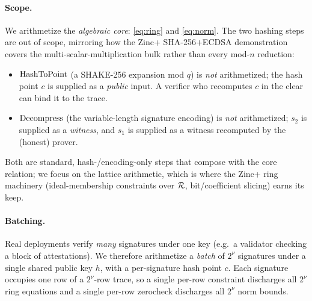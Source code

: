 \paragraph{Scope.}
We arithmetize the \emph{algebraic core}:
\cref{eq:ring} and \cref{eq:norm}. The two hashing steps are out of
scope, mirroring how the Zinc+ SHA-256$+$ECDSA demonstration covers the
multi-scalar-multiplication bulk rather than every mod-$n$ reduction:
\begin{itemize}[leftmargin=1.5em]
  \item $\operatorname{HashToPoint}$ (a SHAKE-256 expansion mod $q$) is \emph{not}
  arithmetized; the hash point $c$ is supplied as a \emph{public}
  input. A verifier who recomputes $c$ in the clear can bind it to the
  trace.
  \item $\operatorname{Decompress}$ (the variable-length signature encoding) is
  \emph{not} arithmetized; $s_2$ is supplied as a \emph{witness}, and
  $s_1$ is supplied as a witness recomputed by the (honest) prover.
\end{itemize}
Both are standard, hash-/encoding-only steps that compose with the core
relation; we focus on the lattice arithmetic, which is where the Zinc+
ring machinery (ideal-membership constraints over $\mathcal{R}$, bit/coefficient
slicing) earns its keep.

\paragraph{Batching.}
Real deployments verify \emph{many} signatures under one key (e.g.\ a
validator checking a block of attestations). We therefore arithmetize a
\emph{batch} of $2^{\nu}$ signatures under a single shared public key
$h$, with a per-signature hash point $c$. Each signature occupies one
row of a $2^{\nu}$-row trace, so a single per-row constraint discharges
all $2^{\nu}$ ring equations and a single per-row zerocheck discharges
all $2^{\nu}$ norm bounds.
